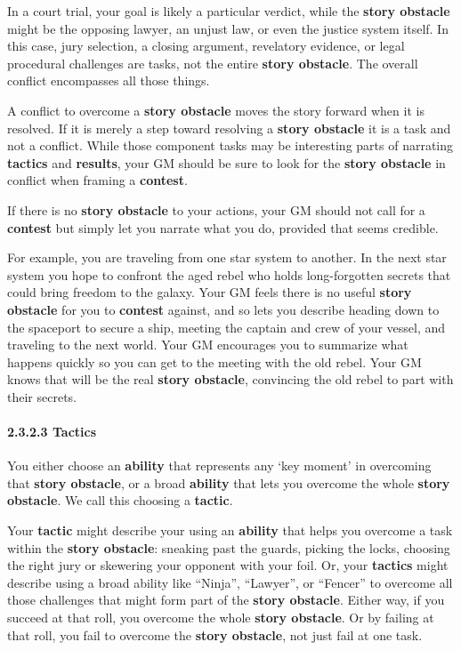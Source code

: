 \documentclass[
]{article}
\begin{document}
In a court trial, your goal is likely a particular verdict, while the
\textbf{story obstacle} might be the opposing lawyer, an unjust law, or
even the justice system itself. In this case, jury selection, a closing
argument, revelatory evidence, or legal procedural challenges are tasks,
not the entire \textbf{story obstacle}. The overall conflict encompasses
all those things.

A conflict to overcome a \textbf{story obstacle} moves the story forward
when it is resolved. If it is merely a step toward resolving a
\textbf{story obstacle} it is a task and not a conflict. While those
component tasks may be interesting parts of narrating \textbf{tactics}
and \textbf{results}, your GM should be sure to look for the
\textbf{story obstacle} in conflict when framing a \textbf{contest}.

If there is no \textbf{story obstacle} to your actions, your GM should
not call for a \textbf{contest} but simply let you narrate what you do,
provided that seems credible.

For example, you are traveling from one star system to another. In the
next star system you hope to confront the aged rebel who holds
long-forgotten secrets that could bring freedom to the galaxy. Your GM
feels there is no useful \textbf{story obstacle} for you to
\textbf{contest} against, and so lets you describe heading down to the
spaceport to secure a ship, meeting the captain and crew of your vessel,
and traveling to the next world. Your GM encourages you to summarize
what happens quickly so you can get to the meeting with the old rebel.
Your GM knows that will be the real \textbf{story obstacle}, convincing
the old rebel to part with their secrets.

\hypertarget{tactics}{%
\paragraph{2.3.2.3 Tactics}\label{tactics}}

You either choose an \textbf{ability} that represents any `key moment'
in overcoming that \textbf{story obstacle}, or a broad \textbf{ability}
that lets you overcome the whole \textbf{story obstacle}. We call this
choosing a \textbf{tactic}.

Your \textbf{tactic} might describe your using an \textbf{ability} that
helps you overcome a task within the \textbf{story obstacle}: sneaking
past the guards, picking the locks, choosing the right jury or skewering
your opponent with your foil. Or, your \textbf{tactics} might describe
using a broad ability like ``Ninja'', ``Lawyer'', or ``Fencer'' to
overcome all those challenges that might form part of the \textbf{story
obstacle}. Either way, if you succeed at that roll, you overcome the
whole \textbf{story obstacle}. Or by failing at that roll, you fail to
overcome the \textbf{story obstacle}, not just fail at one task.
\end{document}
